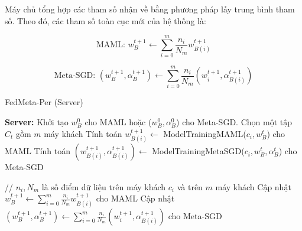 \begin{table}[H]
    \caption{Bảng các tham số tại máy chủ hệ thống FedMeta-Per}
    \label{tab:param_fedmetaper}
\end{table}

Máy chủ tổng hợp các tham số nhận về bằng phương pháp lấy trung bình tham số. Theo đó, các tham số toàn cục mới của hệ thống là:

\begin{dmath}
    \text{MAML: } w_{B}^{t+1} \gets \sum_{i=0}^m \frac{n_i}{N_m} w_{B(i)}^{t+1}
\end{dmath}

\begin{dmath}
    \text{Meta-SGD: } (w_B^{t+1}, \alpha_B^{t+1}) \gets \sum_{i=0}^m \frac{n_i}{N_m} (w_i^{t+1}, \alpha_{B(i)}^{t+1})
\end{dmath}

\begin{algorithm} [H]
    \caption{FedMeta-Per (Server)} \label{alg:fedmeta_per_server}
    \begin{algorithmic}[1]
        \State \textbf{Server:}
        \State Khởi tạo $w_B^0$ cho MAML hoặc ($w_B^0, \alpha_B^0$) cho Meta-SGD.
            \State Chọn một tập $C_t$ gồm $m$ máy khách
                \State Tính toán $w_{B(i)}^{t+1} \gets$ ModelTrainingMAML($c_i, w_B^t$) cho MAML
                \State Tính toán $(w_{B(i)}^{t+1}, \alpha_{B(i)}^{t+1}) \gets$ ModelTrainingMetaSGD($c_i, w_B^t, \alpha_B^t$) cho Meta-SGD
            \EndFor

            \State
            \State // $n_i, N_m$ là số điểm dữ liệu trên máy khách $c_i$ và trên $m$ máy khách
            \State Cập nhật $w_{B}^{t+1} \gets \sum_{i=0}^m \frac{n_i}{N_m} w_{B(i)}^{t+1}$ cho MAML
            \State Cập nhật $(w_B^{t+1}, \alpha_B^{t+1}) \gets \sum_{i=0}^m \frac{n_i}{N_m} (w_i^{t+1}, \alpha_{B(i)}^{t+1})$ cho Meta-SGD
        \EndFor
    \end{algorithmic}
\end{algorithm}


